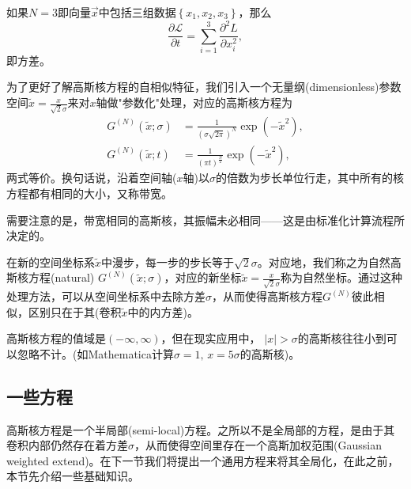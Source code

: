 \begin{subappendices}
如果$N=3$即向量$\vec{x}$中包括三组数据$\left\{x_{1},x_{2},x_{3}\right\}$，那么
\begin{equation*}
  \frac{\partial \mathcal{L}}{\partial t} = \sum_{i=1}^{3} \frac{\partial^{2} L}{\partial x_{i}^{2}},
\end{equation*}
即方差。


为了更好了解高斯核方程的自相似特征，我们引入一个无量纲(dimensionless)参数空间$\tilde{x} = \frac{x}{ \sqrt{2} \sigma}$来对$x$轴做"参数化"处理，对应的高斯核方程为
\begin{equation*}
\begin{split}
    G^{(N)} \left( \tilde{x}; \sigma \right) & = \frac{1}{\left( \sigma \sqrt{2 \pi} \right)^{N}} \exp \left( - \tilde{x}^{2} \right), \\
    G^{(N)} \left( \tilde{x}; t \right) & =
    \frac{1}{\left(\pi t\right)^{\frac{N}{2}}} \exp \left( - \tilde{x}^{2} \right),
\end{split}
\end{equation*}
两式等价。换句话说，沿着空间轴($x$轴)以$\sigma$的倍数为步长单位行走，其中所有的核方程都有相同的大小，又称带宽。

需要注意的是，带宽相同的高斯核，其振幅未必相同——这是由标准化计算流程所决定的。

在新的空间坐标系$\tilde{x}$中漫步，每一步的步长等于$\sqrt{2} \sigma$。对应地，我们称之为自然高斯核方程(natural) $G^{(N)} \left( \tilde{x} ; \sigma \right)$，对应的新坐标$\tilde{x} = \frac{x}{\sqrt{2} \sigma}$称为自然坐标。通过这种处理方法，可以从空间坐标系中去除方差$\sigma$，从而使得高斯核方程$G^{(N)}$彼此相似，区别只在于其(卷积$\tilde{x}$中的内方差)。

高斯核方程的值域是$\left( - \infty, \infty \right)$，但在现实应用中， $\left| x \right| > \sigma$的高斯核往往小到可以忽略不计。(如Mathematica计算$\sigma = 1, \, x = 5 \sigma$的高斯核)。

\subsection{一些方程}
\label{sec:kernel-gaussian-prep}
高斯核方程是一个半局部(semi-local)方程。之所以不是全局部的方程，是由于其卷积内部仍然存在着方差$\sigma$，从而使得空间里存在一个高斯加权范围(Gaussian weighted extend)。在下一节我们将提出一个通用方程来将其全局化，在此之前，本节先介绍一些基础知识。


\end{subappendices}
